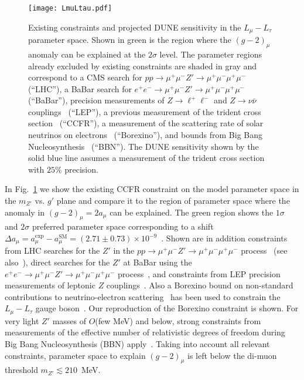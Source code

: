 \begin{figure}[tb!] \centering
\texttt{[image: LmuLtau.pdf]}
\caption{Existing constraints and projected DUNE sensitivity in the $L_\mu - L_\tau$ parameter space. Shown in green is the region where the $(g-2)_\mu$ anomaly can be explained at the $2\sigma$ level. The parameter regions already excluded by existing constraints are shaded in gray and correspond to a CMS search for $pp \to \mu^+\mu^- Z' \to \mu^+\mu^-\mu^+\mu^-$~\cite{Sirunyan:2018nnz} (``LHC''), a BaBar search for $e^+e^- \to \mu^+\mu^- Z' \to \mu^+\mu^-\mu^+\mu^-$~\cite{TheBABAR:2016rlg} (``BaBar''), precision measurements of $Z \to \ell^+ \ell^-$ and $Z \to \nu\bar\nu$ couplings~\cite{ALEPH:2005ab,Altmannshofer:2014cfa} (``LEP''), a previous measurement of the trident cross section~\cite{Mishra:1991bv,Altmannshofer:2014pba} (``CCFR''), a measurement of the scattering rate of solar neutrinos on electrons~\cite{Bellini:2011rx,Harnik:2012ni,Agostini:2017ixy} (``Borexino''), and bounds from Big Bang Nucleosynthesis~\cite{Ahlgren:2013wba,Kamada:2015era} (``BBN''). The DUNE sensitivity shown by the solid blue line assumes a measurement of the trident cross section with $25\%$ precision.}
\label{fig:LmuLtau}
\end{figure}

In Fig.~\ref{fig:LmuLtau} we show the existing CCFR constraint on the model parameter space in the $m_{Z'}$ vs. $g'$ plane and compare it to the region of parameter space where the anomaly in $(g-2)_\mu = 2 a_\mu$ can be explained. The green region shows the $1\sigma$ and $2\sigma$ preferred parameter space corresponding to a shift $\Delta a_\mu = a_\mu^\text{exp}-a_\mu^\text{SM} = (2.71 \pm 0.73) \times 10^{-9}$~\cite{Keshavarzi:2018mgv}.
Shown are in addition constraints from LHC searches for the $Z'$ in the $pp \to \mu^+\mu^- Z' \to \mu^+\mu^-\mu^+\mu^-$ process~\cite{Sirunyan:2018nnz} (see also~\cite{Altmannshofer:2014pba}), direct searches for the $Z'$ at BaBar using the $e^+e^- \to \mu^+\mu^- Z' \to \mu^+\mu^-\mu^+\mu^-$ process~\cite{TheBABAR:2016rlg}, and constraints from LEP precision measurements of leptonic $Z$ couplings~\cite{ALEPH:2005ab,Altmannshofer:2014cfa}.  
Also a Borexino bound on non-standard contributions to neutrino-electron scattering~\cite{Harnik:2012ni,Bellini:2011rx,Agostini:2017ixy} has been used to constrain the $L_\mu - L_\tau$ gauge boson~\cite{Kamada:2015era,Araki:2015mya,Kamada:2018zxi}. Our reproduction of the Borexino constraint is shown.
For very light $Z'$ masses of $O$(few MeV) and below, strong constraints from measurements of the effective number of relativistic degrees of freedom during Big Bang Nucleosynthesis (BBN) apply~\cite{Ahlgren:2013wba,Kamada:2015era}.
Taking into account all relevant constraints, parameter space to explain $(g-2)_\mu$ is left below the di-muon threshold $m_{Z'} \lesssim 210$~MeV.

